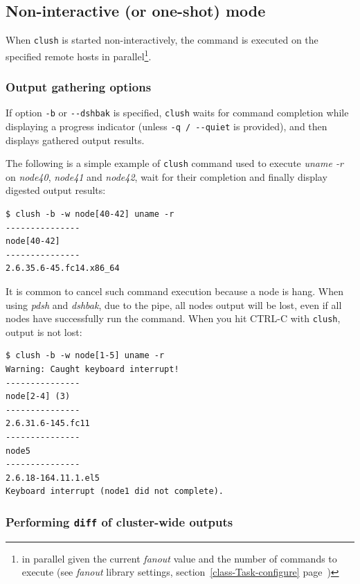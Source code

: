 \documentclass[english,a4paper]{csuserguide}
\newcommand{\clush}{\texttt{clush}\xspace}
\begin{document}
\subsection{Non-interactive (or one-shot) mode}
\label{clush-oneshot}

When \clush is started non-interactively, the command is executed on the specified remote hosts in parallel\footnote{in parallel given the current \textit{fanout} value and the number of commands to execute (see \textit{fanout} library settings, section~\ref{class-Task-configure} page~\pageref{class-Task-configure})}.

\subsubsection{Output gathering options}
If option \verb+-b+ or \verb+--dshbak+ is specified, \clush waits for command completion while displaying a progress indicator (unless \verb+-q / --quiet+ is provided), and
then displays gathered output results.

The following is a simple example of \clush command used to execute \textit{uname -r} on \textit{node40}, \textit{node41} and \textit{node42}, wait for their completion and finally display digested output results:
\bigskip

\begin{lstlisting}[breaklines=true, breakatwhitespace=true]
$ clush -b -w node[40-42] uname -r
---------------
node[40-42]
---------------
2.6.35.6-45.fc14.x86_64
\end{lstlisting}

\pagebreak[4]

It is common to cancel such command execution because a node is hang. When using \textit{pdsh} and \textit{dshbak}, due to the pipe, all nodes output will be lost, even if all nodes have successfully run the command. When you hit CTRL-C with \clush, output is not lost:
\bigskip

\begin{lstlisting}[breaklines=true, breakatwhitespace=true]
$ clush -b -w node[1-5] uname -r
Warning: Caught keyboard interrupt!
---------------
node[2-4] (3)
---------------
2.6.31.6-145.fc11
---------------
node5
---------------
2.6.18-164.11.1.el5
Keyboard interrupt (node1 did not complete).
\end{lstlisting}

\subsubsection{Performing \texttt{diff} of cluster-wide outputs}
\end{document}
